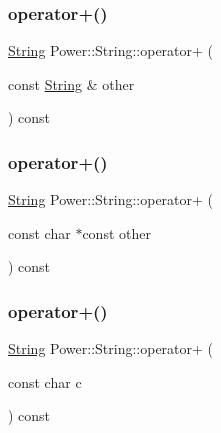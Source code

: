 \mbox{\label{class_power_1_1_string_a570430069e83e0421ccdfb3cddc8a899}} 
\subsubsection{\texorpdfstring{operator+()}{operator+()}\hspace{0.1cm}{\footnotesize\ttfamily [1/11]}}
{\footnotesize\ttfamily \hyperlink{class_power_1_1_string}{String} Power\+::\+String\+::operator+ (\begin{DoxyParamCaption}\item[{const \hyperlink{class_power_1_1_string}{String} \&}]{other }\end{DoxyParamCaption}) const\hspace{0.3cm}{\ttfamily [inline]}}

\mbox{\label{class_power_1_1_string_af34ca6369790db392b8a39e2149e5201}} 
\subsubsection{\texorpdfstring{operator+()}{operator+()}\hspace{0.1cm}{\footnotesize\ttfamily [2/11]}}
{\footnotesize\ttfamily \hyperlink{class_power_1_1_string}{String} Power\+::\+String\+::operator+ (\begin{DoxyParamCaption}\item[{const char $\ast$const}]{other }\end{DoxyParamCaption}) const\hspace{0.3cm}{\ttfamily [inline]}}

\mbox{\label{class_power_1_1_string_ada2da9028cb2a4ebffc585a1da8a942f}} 
\subsubsection{\texorpdfstring{operator+()}{operator+()}\hspace{0.1cm}{\footnotesize\ttfamily [3/11]}}
{\footnotesize\ttfamily \hyperlink{class_power_1_1_string}{String} Power\+::\+String\+::operator+ (\begin{DoxyParamCaption}\item[{const char}]{c }\end{DoxyParamCaption}) const\hspace{0.3cm}{\ttfamily [inline]}}

